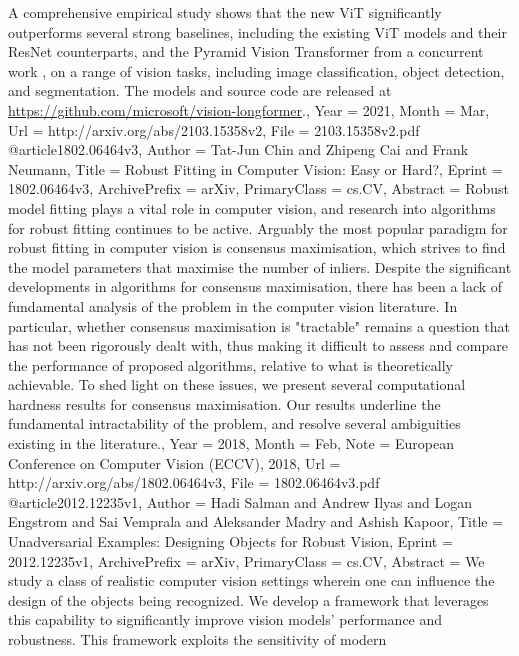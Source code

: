 {{{A comprehensive empirical study shows that the new ViT significantly
outperforms several strong baselines, including the existing ViT models and
their ResNet counterparts, and the Pyramid Vision Transformer from a concurrent
work \cite{wang2021pyramid}, on a range of vision tasks, including image
classification, object detection, and segmentation. The models and source code
are released at \url{https://github.com/microsoft/vision-longformer}.},
Year          = {2021},
Month         = {Mar},
Url           = {http://arxiv.org/abs/2103.15358v2},
File          = {2103.15358v2.pdf}
}
@article{1802.06464v3,
Author        = {Tat-Jun Chin and Zhipeng Cai and Frank Neumann},
Title         = {Robust Fitting in Computer Vision: Easy or Hard?},
Eprint        = {1802.06464v3},
ArchivePrefix = {arXiv},
PrimaryClass  = {cs.CV},
Abstract      = {Robust model fitting plays a vital role in computer vision, and research into
algorithms for robust fitting continues to be active. Arguably the most popular
paradigm for robust fitting in computer vision is consensus maximisation, which
strives to find the model parameters that maximise the number of inliers.
Despite the significant developments in algorithms for consensus maximisation,
there has been a lack of fundamental analysis of the problem in the computer
vision literature. In particular, whether consensus maximisation is "tractable"
remains a question that has not been rigorously dealt with, thus making it
difficult to assess and compare the performance of proposed algorithms,
relative to what is theoretically achievable. To shed light on these issues, we
present several computational hardness results for consensus maximisation. Our
results underline the fundamental intractability of the problem, and resolve
several ambiguities existing in the literature.},
Year          = {2018},
Month         = {Feb},
Note          = {European Conference on Computer Vision (ECCV), 2018},
Url           = {http://arxiv.org/abs/1802.06464v3},
File          = {1802.06464v3.pdf}
}
@article{2012.12235v1,
Author        = {Hadi Salman and Andrew Ilyas and Logan Engstrom and Sai Vemprala and Aleksander Madry and Ashish Kapoor},
Title         = {Unadversarial Examples: Designing Objects for Robust Vision},
Eprint        = {2012.12235v1},
ArchivePrefix = {arXiv},
PrimaryClass  = {cs.CV},
Abstract      = {We study a class of realistic computer vision settings wherein one can
influence the design of the objects being recognized. We develop a framework
that leverages this capability to significantly improve vision models'
performance and robustness. This framework exploits the sensitivity of modern
}}}
